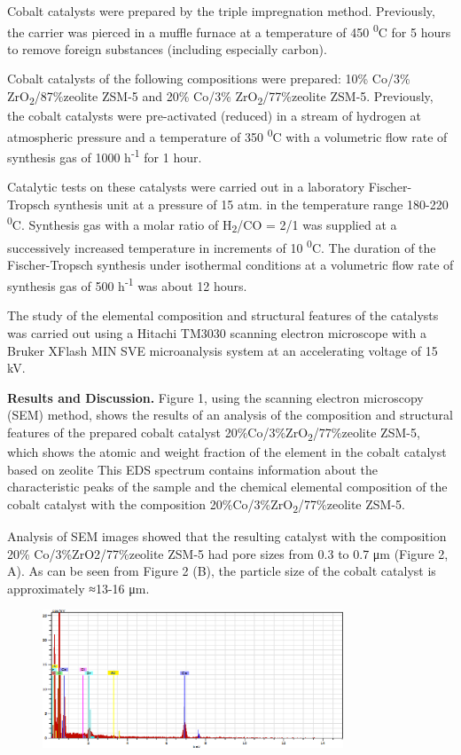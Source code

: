 Cobalt catalysts were prepared by the triple impregnation method.
Previously, the carrier was pierced in a muffle furnace at a temperature
of 450 \textsuperscript{0}C for 5 hours to remove foreign substances
(including especially carbon).

Cobalt catalysts of the following compositions were prepared: 10\%
Co/3\% ZrO\textsubscript{2}/87\%zeolite ZSM-5 and 20\% Co/3\%
ZrO\textsubscript{2}/77\%zeolite ZSM-5. Previously, the cobalt catalysts
were pre-activated (reduced) in a stream of hydrogen at atmospheric
pressure and a temperature of 350 \textsuperscript{0}C with a volumetric
flow rate of synthesis gas of 1000 h\textsuperscript{-1} for 1 hour.

Catalytic tests on these catalysts were carried out in a laboratory
Fischer-Tropsch synthesis unit at a pressure of 15 atm. in the
temperature range 180-220 \textsuperscript{0}C. Synthesis gas with a
molar ratio of H\textsubscript{2}/CO = 2/1 was supplied at a
successively increased temperature in increments of 10
\textsuperscript{0}C. The duration of the Fischer-Tropsch synthesis
under isothermal conditions at a volumetric flow rate of synthesis gas
of 500 h\textsuperscript{-1} was about 12 hours.

The study of the elemental composition and structural features of the
catalysts was carried out using a Hitachi TM3030 scanning electron
microscope with a Bruker XFlash MIN SVE microanalysis system at an
accelerating voltage of 15 kV.

{\bfseries Results and Discussion.} Figure 1, using the scanning electron
microscopy (SEM) method, shows the results of an analysis of the
composition and structural features of the prepared cobalt catalyst
20\%Co/3\%ZrO\textsubscript{2}/77\%zeolite ZSM-5, which shows the atomic
and weight fraction of the element in the cobalt catalyst based on
zeolite This EDS spectrum contains information about the characteristic
peaks of the sample and the chemical elemental composition of the cobalt
catalyst with the composition 20\%Co/3\%ZrO\textsubscript{2}/77\%zeolite
ZSM-5.

Analysis of SEM images showed that the resulting catalyst with the
composition 20\% Co/3\%ZrO2/77\%zeolite ZSM-5 had pore sizes from 0.3 to
0.7 μm (Figure 2, A). As can be seen from Figure 2 (B), the particle
size of the cobalt catalyst is approximately ≈13-16 μm.

\begin{figure}[H]
	\centering
	\includegraphics[width=0.8\textwidth]{assets/1076}
	\caption*{}
\end{figure}


